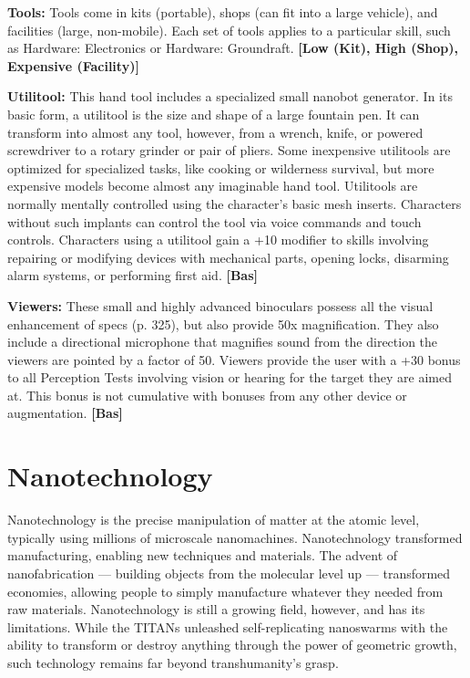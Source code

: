 {{\textbf{Tools:} Tools come in kits (portable), shops (can fit into a large vehicle), and facilities (large, non-mobile). Each set of tools applies to a particular skill, such as Hardware: Electronics or Hardware: Groundraft. \textbf{[Low (Kit), High (Shop), Expensive (Facility)]} 

\textbf{Utilitool:} This hand tool includes a specialized small nanobot generator. In its basic form, a utilitool is the size and shape of a large fountain pen. It can transform into almost any tool, however, from a wrench, knife, or powered screwdriver to a rotary grinder or pair of pliers. Some inexpensive utilitools are optimized for specialized tasks, like cooking or wilderness survival, but more expensive models become almost any imaginable hand tool. Utilitools are normally mentally controlled using the character’s basic mesh inserts. Characters without such implants can control the tool via voice commands and touch controls. Characters using a utilitool gain a +10 modifier to skills involving repairing or modifying devices with mechanical parts, opening locks, disarming alarm systems, or performing first aid. \textbf{[Bas]} 

\textbf{Viewers:} These small and highly advanced binoculars possess all the visual enhancement of specs (p. 325), but also provide 50x magnification. They also include a directional microphone that magnifies sound from the direction the viewers are pointed by a factor of 50. Viewers provide the user with a +30 bonus to all Perception Tests involving vision or hearing for the target they are aimed at. This bonus is not cumulative with bonuses from any other device or augmentation. \textbf{[Bas]} 



\section{Nanotechnology} \label{sec:nanotech} 

Nanotechnology is the precise manipulation of matter at the atomic level, typically using millions of microscale nanomachines. Nanotechnology transformed manufacturing, enabling new techniques and materials. The advent of nanofabrication --- building objects from the molecular level up --- transformed economies, allowing people to simply manufacture whatever they needed from raw materials. Nanotechnology is still a growing field, however, and has its limitations. While the TITANs unleashed self-replicating nanoswarms with the ability to transform or destroy anything through the power of geometric growth, such technology remains far beyond transhumanity’s grasp. 



}}
